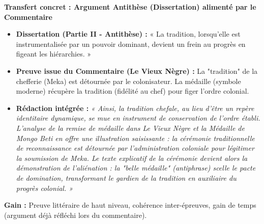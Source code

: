 \documentclass[11pt]{article}
\begin{document}
\begin{exoresolu}
    \textbf{Transfert concret : Argument Antithèse (Dissertation) alimenté par le Commentaire}
    \begin{itemize}
        \item \textbf{Dissertation (Partie II - Antithèse) :} « La tradition, lorsqu'elle est instrumentalisée par un pouvoir dominant, devient un frein au progrès en figeant les hiérarchies. »
        \item \textbf{Preuve issue du Commentaire (Le Vieux Nègre) :} La "tradition" de la chefferie (Meka) est détournée par le colonisateur. La médaille (symbole moderne) récupère la tradition (fidélité au chef) pour figer l'ordre colonial.
        \item \textbf{Rédaction intégrée :} \emph{« Ainsi, la tradition chefale, au lieu d'être un repère identitaire dynamique, se mue en instrument de conservation de l'ordre établi. L'analyse de la remise de médaille dans \og Le Vieux Nègre et la Médaille \fg{} de Mongo Beti en offre une illustration saisissante : la cérémonie traditionnelle de reconnaissance est détournée par l'administration coloniale pour légitimer la soumission de Meka. Le texte explicatif de la cérémonie devient alors la démonstration de l'aliénation : la "belle médaille" (antiphrase) scelle le pacte de domination, transformant le gardien de la tradition en auxiliaire du progrès colonial. »}
    \end{itemize}
    \textbf{Gain :} Preuve littéraire de haut niveau, cohérence inter-épreuves, gain de temps (argument déjà réfléchi lors du commentaire).
\end{exoresolu}
\end{document}

